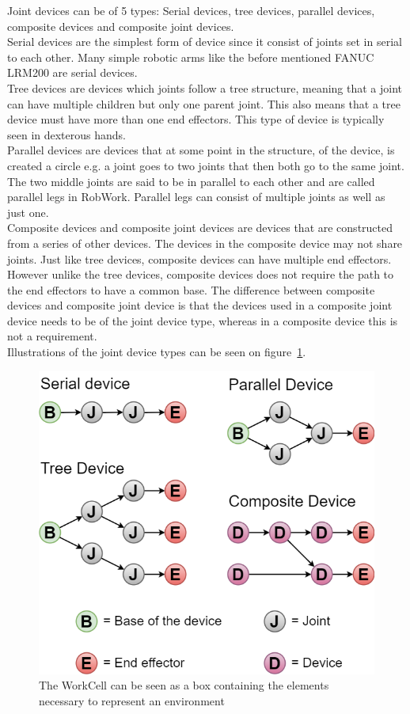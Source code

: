 Joint devices can be of 5 types: Serial devices, tree devices, parallel devices, composite devices and composite joint devices.\\
Serial devices are the simplest form of device since it consist of joints set in serial to each other. Many simple robotic arms like the before mentioned FANUC LRM200 are serial devices.\\
Tree devices are devices which joints follow a tree structure, meaning that a joint can have multiple children but only one parent joint. This also means that a tree device must have more than one end effectors. This type of device is typically seen in dexterous hands.\\
Parallel devices are devices that at some point in the structure, of the device, is created a circle e.g. a joint goes to two joints that then both go to the same joint. The two middle joints are said to be in parallel to each other and are called parallel legs in RobWork. Parallel legs can consist of multiple joints as well as just one.\\
Composite devices and composite joint devices are devices that are constructed from a series of other devices. The devices in the composite device may not share joints. Just like tree devices, composite devices can have multiple end effectors. However unlike the tree devices, composite devices does not require the path to the end effectors to have a common base. The difference between composite devices and composite joint device is that the devices used in a composite joint device needs to be of the joint device type, whereas in a composite device this is not a requirement.\\
Illustrations of the joint device types can be seen on figure~\ref{fig:DeviceTypes}.

\begin{figure}[h]
	\centering
	\includegraphics[scale=0.55]{Figures/DeviceTypes.png}
	\caption{The WorkCell can be seen as a box containing the elements necessary to represent an environment}
	\label{fig:DeviceTypes}
\end{figure}


